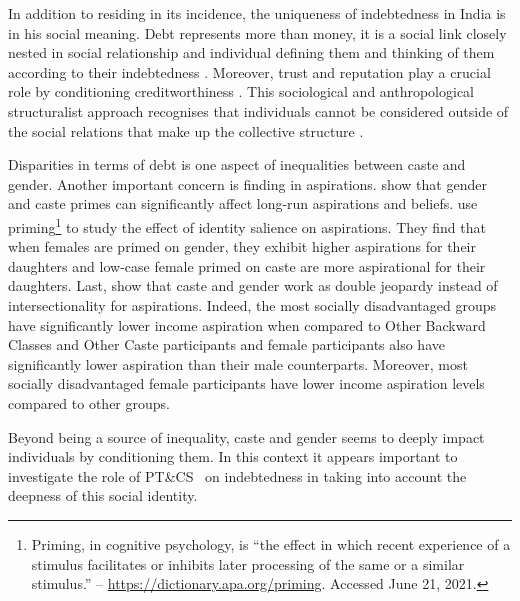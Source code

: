 \documentclass[a4paper, 11pt, onecolumn]{article}
\newcommand{\PTCS}{PT\&CS}
\begin{document}
In addition to residing in its incidence, the uniqueness of indebtedness in India is in his social meaning. 
Debt represents more than money, it is a social link closely nested in social relationship and individual defining them and thinking of them according to their indebtedness \citep{Guerin2014}. 
Moreover, trust and reputation play a crucial role by conditioning creditworthiness \citep{Guerin2021}.
This sociological and anthropological structuralist approach recognises that individuals cannot be considered outside of the social relations that make up the collective structure \citep{Polanyi1944}. 


Disparities in terms of debt is one aspect of inequalities between caste and gender.
Another important concern is finding in aspirations.
\cite{Mukherjee2017} show that gender and caste primes can significantly affect long-run aspirations and beliefs. 
\cite{Alvi2019} use priming\footnote{Priming, in cognitive psychology, is ``the effect in which recent experience of a stimulus facilitates or inhibits later processing of the same or a similar stimulus.'' -- \url{https://dictionary.apa.org/priming}. Accessed June 21, 2021.} to study the effect of identity salience on aspirations.
They find that when females are primed on gender, they exhibit higher aspirations for their daughters and low-case female primed on caste are more aspirational for their daughters.
Last, \cite{Sarkar2020} show that caste and gender work as double jeopardy instead of intersectionality for aspirations.
Indeed, the most socially disadvantaged groups have significantly lower income aspiration when compared to Other Backward Classes and Other Caste participants and female participants also have significantly lower aspiration than their male counterparts.
Moreover, most socially disadvantaged female participants have lower income aspiration levels compared to other groups.

Beyond being a source of inequality, caste and gender seems to deeply impact individuals by conditioning them.
In this context it appears important to investigate the role of \PTCS~ on indebtedness in taking into account the deepness of this social identity.

\end{document}
